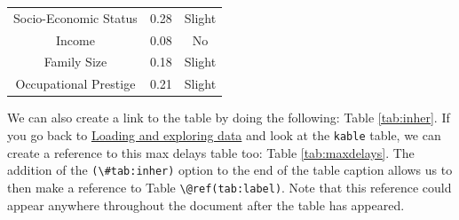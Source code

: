 \documentclass[12pt,twoside]{reedthesis}
\theoremstyle{definition}
\theoremstyle{definition}
\theoremstyle{definition}
\theoremstyle{remark}
\begin{document}
\begin{longtable}[]{@{}ccc@{}}
\begin{minipage}[t]{0.29\columnwidth}\centering\strut
Socio-Economic Status\strut
\end{minipage} & \begin{minipage}[t]{0.47\columnwidth}\centering\strut
0.28\strut
\end{minipage} & \begin{minipage}[t]{0.16\columnwidth}\centering\strut
Slight\strut
\end{minipage}\tabularnewline
\begin{minipage}[t]{0.29\columnwidth}\centering\strut
Income\strut
\end{minipage} & \begin{minipage}[t]{0.47\columnwidth}\centering\strut
0.08\strut
\end{minipage} & \begin{minipage}[t]{0.16\columnwidth}\centering\strut
No\strut
\end{minipage}\tabularnewline
\begin{minipage}[t]{0.29\columnwidth}\centering\strut
Family Size\strut
\end{minipage} & \begin{minipage}[t]{0.47\columnwidth}\centering\strut
0.18\strut
\end{minipage} & \begin{minipage}[t]{0.16\columnwidth}\centering\strut
Slight\strut
\end{minipage}\tabularnewline
\begin{minipage}[t]{0.29\columnwidth}\centering\strut
Occupational Prestige\strut
\end{minipage} & \begin{minipage}[t]{0.47\columnwidth}\centering\strut
0.21\strut
\end{minipage} & \begin{minipage}[t]{0.16\columnwidth}\centering\strut
Slight\strut
\end{minipage}\tabularnewline
\bottomrule
\end{longtable}
We can also create a link to the table by doing the following: Table
\ref{tab:inher}. If you go back to
\protect\hyperlink{loading-and-exploring-data}{Loading and exploring
data} and look at the \texttt{kable} table, we can create a reference to
this max delays table too: Table \ref{tab:maxdelays}. The addition of
the \texttt{(\textbackslash{}\#tab:inher)} option to the end of the
table caption allows us to then make a reference to Table
\texttt{\textbackslash{}@ref(tab:label)}. Note that this reference could
appear anywhere throughout the document after the table has appeared.
\end{document}

